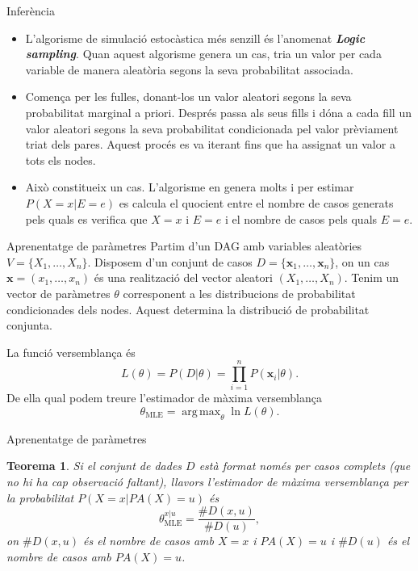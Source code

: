 \documentclass{beamer}
\newtheorem{teorema}{Teorema}
\theoremstyle{definition}
\DeclareMathOperator*{\argmax}{arg\,max}
\begin{document}
\begin{frame}{Infer\`{e}ncia}
\begin{itemize}
\item L'algorisme de simulaci\'{o} estoc\`{a}stica m\'{e}s senzill \'{e}s l'anomenat \textbf{\emph{Logic sampling}}. Quan aquest algorisme genera un cas, tria un valor per cada variable de manera aleat\`{o}ria segons la seva probabilitat associada.
\pause
\item Comen\c{c}a per les fulles, donant-los un valor aleatori segons la seva probabilitat marginal a priori. Despr\'{e}s passa als seus fills i d\'{o}na a cada fill un valor aleatori segons la seva probabilitat condicionada pel valor pr\`{e}viament triat dels pares. Aquest proc\'{e}s es va iterant fins que ha assignat un valor a tots els nodes.
\pause
\item Aix\`{o} constitueix un cas. L'algorisme en genera molts i per estimar $P(X=x|E=e)$ es calcula el quocient entre el nombre de casos generats pels quals es verifica que $X=x$ i $E=e$ i el nombre de casos pels quals $E=e$.
\end{itemize}
\end{frame}

\begin{frame}{Aprenentatge de par\`{a}metres}
Partim d'un DAG amb variables aleat\`{o}ries $V=\{X_1,\ldots,X_n\}$. Disposem d'un conjunt de casos $D=\{\boldsymbol{x}_1,\ldots,\boldsymbol{x}_n\}$, on un cas $\boldsymbol{x}=(x_1,\ldots,x_n)$ \'{e}s una realitzaci\'{o} del vector aleatori $(X_1,\ldots,X_n)$. Tenim un vector de par\`{a}metres $\theta$ corresponent a les distribucions de probabilitat condicionades dels nodes. Aquest determina la distribuci\'{o} de probabilitat conjunta.
\pause

La funci\'{o} versemblan\c{c}a \'{e}s
\[L(\theta)=P(D|\theta)=\prod_{i=1}^nP(\boldsymbol{x}_i|\theta).\]
De ella qual podem treure l'estimador de m\`{a}xima versemblan\c{c}a
\[\theta_{\text{MLE}}=\argmax_{\theta}\ln L(\theta).\]
\end{frame}

\begin{frame}{Aprenentatge de par\`{a}metres}
\begin{teorema}
Si el conjunt de dades $D$ est\`{a} format nom\'{e}s per casos complets (que no hi ha cap observaci\'{o} faltant), llavors l'estimador de m\`{a}xima versemblan\c{c}a per la probabilitat $P(X=x|PA(X)=u)$ \'{e}s
\[\theta_{\text{MLE}}^{x|u}=\frac{\#D(x,u)}{\#D(u)},\]
on $\#D(x,u)$ \'{e}s el nombre de casos amb $X=x$ i $PA(X)=u$ i $\#D(u)$ \'{e}s el nombre de casos amb $PA(X)=u$.
\end{teorema}
\end{frame}
\end{document}

